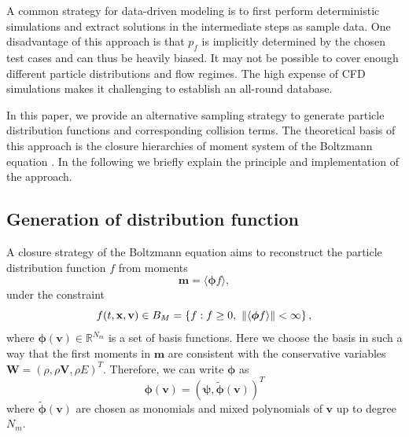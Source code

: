 \documentclass[preprint,3p,12pt,sort&compress]{elsarticle}
\begin{document}
A common strategy for data-driven modeling is to first perform deterministic simulations and extract solutions in the intermediate steps as sample data.
One disadvantage of this approach is that $p_f$ is implicitly determined by the chosen test cases and can thus be heavily biased.
It may not be possible to cover enough different particle distributions and flow regimes.
The high expense of CFD simulations makes it challenging to establish an all-round database.

In this paper, we provide an alternative sampling strategy to generate particle distribution functions and corresponding collision terms.
The theoretical basis of this approach is the closure hierarchies of moment system of the Boltzmann equation \cite{levermore1996moment}.
In the following we briefly explain the principle and implementation of the approach.

\subsection{Generation of distribution function}\label{sec:sample pdf}

A closure strategy of the Boltzmann equation aims to reconstruct the particle distribution function $f$ from moments
\begin{equation}
    \mathbf m = \langle \boldsymbol\phi f \rangle,
\end{equation}
under the constraint
\begin{equation}
    f(t,\mathbf x,\mathbf v)\in B_M = \left\{ f: f \geq 0 ,\ \Arrowvert \langle \boldsymbol\phi f \rangle \Arrowvert < \infty \right\},
\end{equation}
where $\boldsymbol\phi(\mathbf v)\in \mathbb R^{N_m}$ is a set of basis functions.
Here we choose the basis in such a way that the first moments in $\mathbf m$ are consistent with the conservative variables $\mathbf W=(\rho,\rho \mathbf V,\rho E)^T$.
Therefore, we can write $\boldsymbol\phi$ as
\begin{equation}
    \boldsymbol\phi(\mathbf v)=(\boldsymbol \psi, \tilde{\boldsymbol\phi}(\mathbf v))^T
\end{equation}
where $\tilde{\boldsymbol\phi}(\mathbf v)$ are chosen as monomials and mixed polynomials of $\mathbf v$ up to degree $N_m$.
\end{document}
